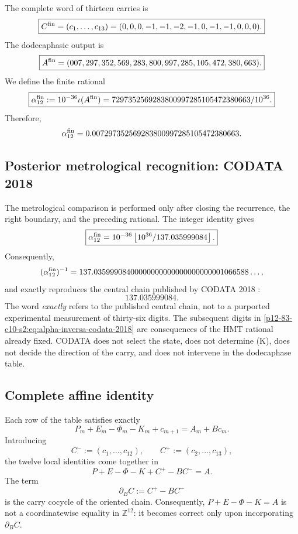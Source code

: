 The complete word of thirteen carries is
\[
 \boxed{
 C^{\rm fin}
 =(c_1,\ldots,c_{13})
 =(0,0,0,-1,-1,-2,-1,0,-1,-1,0,0,0).}
\]
The dodecaphasic output is
\[
 \boxed{
 A^{\rm fin}
 =(007,297,352,569,283,800,997,285,105,472,380,663).}
\]
We define the finite rational
\begin{equation}
 \boxed{
 \alpha_{12}^{\rm fin}
 :=10^{-36}\iota(A^{\rm fin})
 =\frac{7297352569283800997285105472380663}{10^{36}}.}
 \label{p12-83-c10-s2:eq:alpha-finita-autonoma}
\end{equation}
Therefore,
\[
 \alpha_{12}^{\rm fin}
 =0.007297352569283800997285105472380663.
\]

\subsection{Posterior metrological recognition: CODATA 2018}

The metrological comparison is performed only after closing the recurrence,
the right boundary, and the preceding rational. The integer identity gives
\begin{equation}
 \boxed{
 \alpha_{12}^{\rm fin}
 =10^{-36}
 \left\lfloor\frac{10^{36}}{137.035999084}\right\rfloor.}
 \label{p12-83-c10-s2:eq:alpha-finita-codata-2018}
\end{equation}
Consequently,
\begin{equation}
 (\alpha_{12}^{\rm fin})^{-1}
 =137.03599908400000000000000000000001066588\ldots,
 \label{p12-83-c10-s2:eq:alpha-inversa-codata-2018}
\end{equation}
and exactly reproduces the central chain published by CODATA 2018
\cite{Tiesinga2021CODATA}:
\[
 \boxed{137.035999084.}
\]
The word \emph{exactly} refers to the published central chain, not to a purported experimental measurement of thirty-six digits. The subsequent digits in \eqref{p12-83-c10-s2:eq:alpha-inversa-codata-2018} are consequences of the HMT rational already fixed. CODATA does not select the state, does not determine (K), does not decide the direction of the carry, and does not intervene in the dodecaphase table.

\subsection{Complete affine identity}

Each row of the table satisfies exactly
\begin{equation}
 P_m+E_m-\Phi_m-K_m+c_{m+1}
 =A_m+Bc_m.
 \label{p12-83-c10-s2:eq:identidad-local-acarreo-alpha}
\end{equation}
Introducing
\[
 C^-:=(c_1,\ldots,c_{12}),
 \qquad
 C^+:=(c_2,\ldots,c_{13}),
\]
the twelve local identities come together in
\begin{equation}
 \boxed{
 P+E-\Phi-K+C^+-BC^-=A.}
 \label{p12-83-c10-s2:eq:identidad-afin-vectorial-alpha}
\end{equation}
The term
\[
 \partial_BC:=C^+-BC^-
\]
is the carry cocycle of the oriented chain. Consequently,
\(P+E-\Phi-K=A\) is not a coordinatewise equality in
\(\mathbb Z^{12}\): it becomes correct only upon incorporating
\(\partial_BC\).

